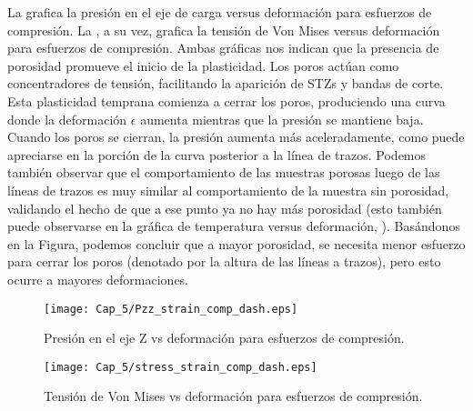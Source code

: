 
La  grafica la presión en el eje de carga versus deformación para esfuerzos de compresión. La ,
a su vez, grafica la tensión de Von Mises versus deformación para esfuerzos de compresión.
Ambas gráficas nos indican que la presencia de porosidad promueve el inicio de la plasticidad. Los poros actúan como concentradores de tensión,
facilitando la aparición de STZs y bandas de corte. Esta plasticidad temprana comienza a
cerrar los poros, produciendo una curva donde la deformación $\epsilon$ aumenta mientras que la presión se mantiene baja.
Cuando los poros se cierran, la presión aumenta más aceleradamente, como puede apreciarse en la porción de la curva posterior
a la línea de trazos. Podemos también observar que el comportamiento de las muestras porosas luego de las líneas de trazos es
muy similar al comportamiento de la muestra sin porosidad, validando el hecho de que a ese punto ya no hay más porosidad (esto también puede observarse en la gráfica de temperatura versus deformación, ). Basándonos en la Figura, podemos concluir que a mayor porosidad, se necesita menor esfuerzo para cerrar los poros (denotado por la altura de las líneas a trazos), pero esto ocurre a mayores deformaciones.

\begin{figure}[H]
  \centering
	\texttt{[image: Cap\_5/Pzz\_strain\_comp\_dash.eps]}
	\caption[Presión en el eje Z vs deformación para esfuerzos de compresión]{Presión en el eje Z vs deformación para esfuerzos de compresión.}
	\label{C5:fg:PzzComp}
\end{figure}

\begin{figure}[H]
  \centering
	\texttt{[image: Cap\_5/stress\_strain\_comp\_dash.eps]}
	\caption[Tensión de Von Mises vs deformación para esfuerzos de compresión]{Tensión de Von Mises vs deformación para esfuerzos de compresión.}
	\label{C5:fg:stressComp}
\end{figure}

